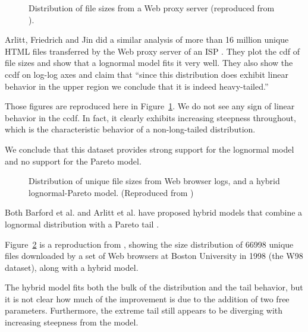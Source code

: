 \documentclass[10pt,twocolumn]{article}
\begin{document}
\begin{figure}[tb]
\centerline{}
\caption{
Distribution of file sizes from a Web proxy server
(reproduced from \cite{ArlittFriedrichJin98}).}
\label{fig.arlitt3}
\end{figure}

Arlitt, Friedrich and Jin did a similar analysis of more than 16
million unique HTML files transferred by the Web proxy server of an
ISP \cite{ArlittFriedrichJin98}.  They plot the cdf of
file sizes and show that a lognormal model fits it very well.  They
also show the ccdf on log-log axes and claim that ``since this
distribution does exhibit linear behavior in the upper region we
conclude that it is indeed heavy-tailed.''

Those figures are reproduced here in
Figure~\ref{fig.arlitt3}.  We do not see any sign of linear behavior
in the ccdf.  In fact, it clearly exhibits increasing steepness
throughout, which is the characteristic behavior of a non-long-tailed
distribution.

We conclude that this dataset provides strong support for the
lognormal model and no support for the Pareto model.



\begin{figure}[tb]
\centerline{}
\caption{
Distribution of unique file sizes from Web browser logs,
and a hybrid lognormal-Pareto model.
(Reproduced from \cite{BarfordBestavrosBradleyCrovella99})}
\label{fig.barford1}
\end{figure}

Both Barford et al. and Arlitt et al. have
proposed hybrid models
that combine a lognormal distribution with a Pareto tail
\cite{BarfordCrovella98}
\cite{BarfordBestavrosBradleyCrovella99}
\cite{ArlittFriedrichJin98}
\cite{ArlittJin99}.

Figure~\ref{fig.barford1} is a reproduction from
\cite{BarfordBestavrosBradleyCrovella99}, showing the size
distribution of 66998 unique files downloaded by a set of Web browsers
at Boston University in 1998 (the W98 dataset), along with a hybrid
model.

The hybrid model fits both the bulk of the distribution and the tail
behavior, but it is not clear how much of the improvement is due to
the addition of two free parameters.  Furthermore, the extreme tail
still appears to be diverging with increasing steepness from the
model.
\end{document}
